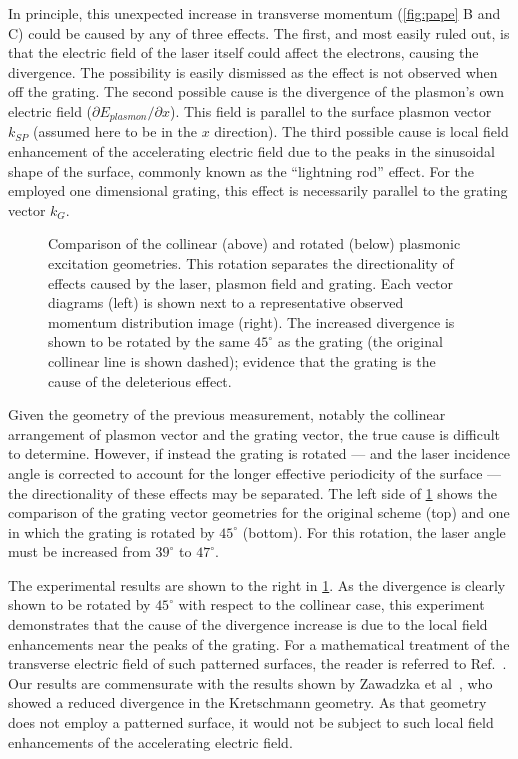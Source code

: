 In principle, this unexpected increase in transverse momentum (\ref{fig:pape} B and C) could be caused by any of three effects.
The first, and most easily ruled out, is that the electric field of the laser itself could affect the electrons, causing the divergence.
The possibility is easily dismissed as the effect is not observed when off the grating.
The second possible cause is the divergence of the plasmon's own electric field ($\partial E_{plasmon} / \partial x$).
This field is parallel to the surface plasmon vector $k_{SP}$ (assumed here to be in the $x$ direction).
The third possible cause is local field enhancement of the accelerating electric field due to the peaks in the sinusoidal shape of the surface, commonly known as the ``lightning rod'' effect.
For the employed one dimensional grating, this effect is necessarily parallel to the grating vector $k_G$.

\begin{figure}
  \centering
  
  \caption[Comparison of the collinear and rotated plasmonic excitation geometries]{
    Comparison of the collinear (above) and rotated (below) plasmonic excitation geometries.
    This rotation separates the directionality of effects caused by the laser, plasmon field and grating.
    Each vector diagrams (left) is shown next to a representative observed momentum distribution image (right).
    The increased divergence is shown to be rotated by the same $45^{\circ}$ as the grating (the original collinear line is shown dashed); evidence that the grating is the cause of the deleterious effect.
  }
  \label{fig:rotated}
\end{figure}

Given the geometry of the previous measurement, notably the collinear arrangement of plasmon vector and the grating vector, the true cause is difficult to determine.
However, if instead the grating is rotated --- and the laser incidence angle is corrected to account for the longer effective periodicity of the surface --- the directionality of these effects may be separated.
The left side of \ref{fig:rotated} shows the comparison of the grating vector geometries for the original scheme (top) and one in which the grating is rotated by $45^{\circ}$ (bottom).
For this rotation, the laser angle must be increased from $39^{\circ}$ to $47^{\circ}$.

The experimental results are shown to the right in \ref{fig:rotated}.
As the divergence is clearly shown to be rotated by $45^{\circ}$ with respect to the collinear case, this experiment demonstrates that the cause of the divergence increase is due to the local field enhancements near the peaks of the grating.
For a mathematical treatment of the transverse electric field of such patterned surfaces, the reader is referred to Ref.~\cite{watts_sharp_1997}. 
Our results are commensurate with the results shown by Zawadzka et al~\cite{zawadzka_evanescent_2001}, who showed a reduced divergence in the Kretschmann geometry.
As that geometry does not employ a patterned surface, it would not be subject to such local field enhancements of the accelerating electric field.


